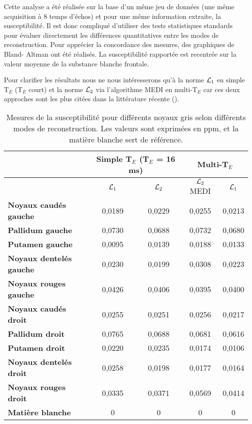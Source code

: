 {Cette analyse a été réalisée sur la base d’un même jeu de données (une même acquisition à 8
temps d’échos) et pour une même information extraite, la susceptibilité. Il est donc compliqué
d’utiliser des tests statistiques standards pour évaluer directement les différences quantitatives entre les modes de reconstruction. Pour apprécier la concordance des mesures, des graphiques de Bland-
Altman ont été réalisés. La susceptibilité rapportée est recentrée sur la valeur moyenne de la substance
blanche frontale.

Pour clarifier les résultats nous ne nous intéresserons qu’à la norme ${\cal L}_1$ en simple T$_E$ (T$_E$ court)
et la norme ${\cal L}_2$ via l’algorithme MEDI en multi-T$_E$ car ces deux approches sont les plus citées dans la
littérature récente (\cite{Wang_Liu_2014}).
\begin {table}
\caption{Mesures de la susceptibilité pour différents noyaux gris selon différents modes de reconstruction. Les valeurs
sont exprimées en ppm, et la matière blanche sert de référence.} 
\label{tab:susceptbilite} 
\centering
\begin{tabularx}{\linewidth}{X c c c c}
\hline
 & \multicolumn{2}{c}{{\bf Simple T$_E$ (T$_E$ = 16 ms) }} & \multicolumn{2}{c}{{\bf Multi-T$_E$}} \\
\hline
 & ${\cal L}_1$ & ${\cal L}_2$ & ${\cal L}_2$ MEDI & $ {\cal L}_1$\\
\hline
{\bf Noyaux caudés gauche } & 0,0189  &  0,0229 &  0,0255 & 0,0213 \\
\hline
{\bf Pallidum gauche } & 0,0730  & 0,0688  & 0,0732 & 0,0680 \\
\hline
{\bf Putamen gauche } &  0,0095 &  0,0139 & 0,0188  & 0,0133 \\
\hline
{\bf Noyaux dentelés gauche} & 0,0230  &  0,0199 & 0,0308 &0,0223 \\ 
\hline
{\bf Noyaux rouges gauche } & 0,0426   & 0,0406  &  0,0395 & 0,0400\\ 
\hline
{\bf Noyaux caudés droit } & 0,0255 & 0,0251 &  0,0256 &  0,0217\\
\hline
{\bf Pallidum droit } &0,0765   &  0,0688 &0,0681  & 0,0616 \\
\hline
{\bf Putamen droit } &  0,0220 &  0,0235 & 0,0174 &0,0106\\ 
\hline
{\bf Noyaux dentelés droit} & 0,0258  & 0,0198  & 0,0177& 0,0164 \\ 
\hline
{\bf Noyaux rouges droit } & 0,0335  &  0,0371 & 0,0569  &0,0414 \\ 
\hline
{\bf Matière blanche} &  0&  0&  0& 0\\ 
\hline
\end{tabularx}


\end{table}}
